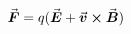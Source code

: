 

\vspace*{\fill}
\centering

\begin{align*}
   \va*{F} = q(\va*{E} + \va*{v} \cross \va*{B}) 
\end{align*}

\centering
\vspace*{\fill}

